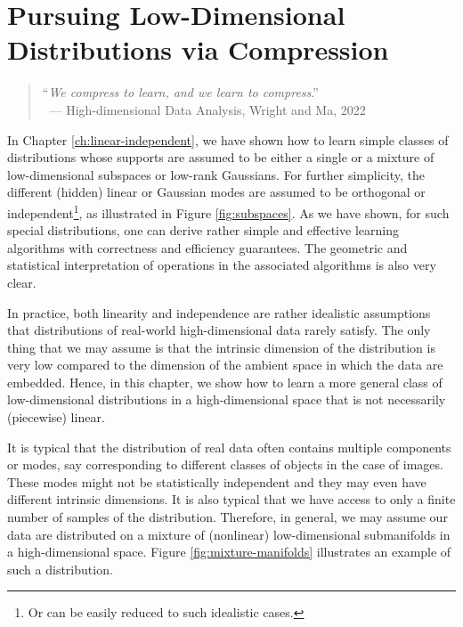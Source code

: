 \documentclass[../../book-main.tex]{subfiles}
\begin{document}
\chapter{Pursuing Low-Dimensional Distributions via Compression}
\label{ch:compression}\label{ch:general-distribution}

\begin{quote}
	\hfill    ``{\em We compress to learn, and we learn to compress}.''\\
	$~$ \hfill --- High-dimensional Data Analysis, Wright and Ma, 2022
\end{quote}
\vspace{5mm}

In Chapter \ref{ch:linear-independent}, we have shown how to learn simple classes of distributions whose supports are assumed to be either a single or a mixture of low-dimensional subspaces or low-rank Gaussians. For further simplicity, the different (hidden) linear or Gaussian modes are assumed to be orthogonal or independent\footnote{Or can be easily reduced to such idealistic cases.}, as illustrated in Figure \ref{fig:subspaces}. As we have shown, for such special distributions, one can derive rather simple and effective learning algorithms with correctness and efficiency guarantees. The geometric and statistical interpretation of operations in the associated algorithms is also very clear.

In practice, both linearity and independence are rather idealistic assumptions that distributions of real-world high-dimensional data rarely satisfy. The only thing that we may assume is that the intrinsic dimension of the distribution is very low compared to the dimension of the ambient space in which the data are embedded. Hence, in this chapter, we show how to learn a more general class of low-dimensional distributions in a high-dimensional space that is not necessarily (piecewise) linear.

It is typical that the distribution of real data often contains multiple components or modes, say corresponding to different classes of objects in the case of images. These modes might not be statistically independent and they may even have different intrinsic dimensions. It is also typical that we have access to only a finite number of samples of the distribution. Therefore, in  general, we may assume our data are distributed on a mixture of (nonlinear) low-dimensional submanifolds in a high-dimensional space. Figure \ref{fig:mixture-manifolds} illustrates an example of such a distribution.
\end{document}
